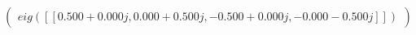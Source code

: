 \documentclass[border=1em]{standalone}
\begin{document}
$
\left(
\begin{array}{cccc}
e
i
g
(
[
[
0
.
5
0
0
+
0
.
0
0
0
j
,
 
0
.
0
0
0
+
0
.
5
0
0
j
,
 
-
0
.
5
0
0
+
0
.
0
0
0
j
,
 
-
0
.
0
0
0
-
0
.
5
0
0
j
]
]
)
\end{array}
\right)
$
\end{document}
